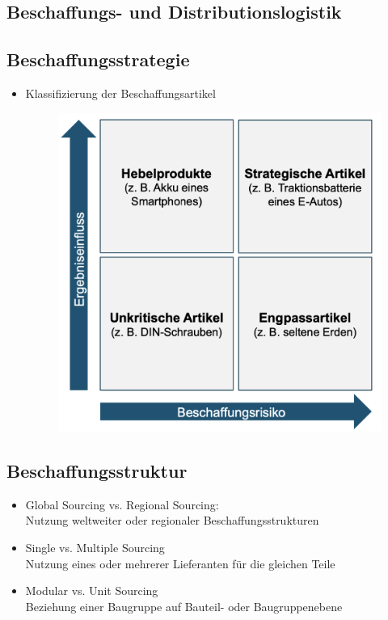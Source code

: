 \documentclass[12pt, letterpaper]{article}
\begin{document}
\begin{CJK*}{UTF8}{gbsn}
\newpage

\section{Beschaffungs- und Distributionslogistik}
\subsection{Beschaffungsstrategie}
\begin{itemize}
\item Klassifizierung der Beschaffungsartikel\\
\begin{figure}[h!]
  \centering %
  \includegraphics[width=0.6\linewidth]{VL31.png}\\
\end{figure}
\end{itemize}

\subsection{Beschaffungsstruktur}
\begin{itemize}
\item Global Sourcing vs. Regional Sourcing:\\
Nutzung weltweiter oder regionaler Beschaffungsstrukturen\\
\item Single vs. Multiple Sourcing\\
Nutzung eines oder mehrerer Lieferanten für die gleichen Teile\\
\item Modular vs. Unit Sourcing\\
Beziehung einer Baugruppe auf Bauteil- oder Baugruppenebene
\end{itemize}


\end{CJK*}
\end{document}
